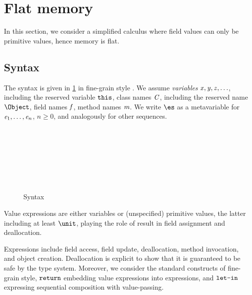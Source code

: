 
\section{Flat memory}\label{sect:flat}

In this section, we consider a simplified calculus where field values can only be primitive values, hence memory is flat.

\subsection{Syntax} 
The syntax is given in \cref{fig:syntax} in fine-grain style \cite{LevyPT03}. We assume \emph{variables} $\mathit{x}, \mathit{y}, \mathit{z}, \ldots$, including the reserved variable $\texttt{this}$, class names $\mathit{C}$, including the reserved name $\Object$, field names $\mathit{f}$, method names $\mathit{m}$. 
We write $\es$ as  a  metavariable for $\mathit{e}_1, \ldots, \mathit{e}_n$, $n\geq 0$, and analogously for other sequences. 
\begin{figure}
\begin{grammatica}
\\
\\
\\
\\
\\
\\
\end{grammatica}
\caption{Syntax}\label{fig:syntax}
\end{figure}

Value expressions are either variables or (unspecified) primitive values, the latter including at least $\unit$, playing the role of result in field assignment and deallocation.  

Expressions include field access, field update, deallocation, method invocation, and object creation.  Deallocation is explicit to show  that it is guaranteed to be safe by the type system.  
Moreover, we consider the standard constructs of fine-grain style, $\texttt{return}$ embedding value expressions into expressions, and $\texttt{let-in}$ expressing sequential composition with value-passing. 

